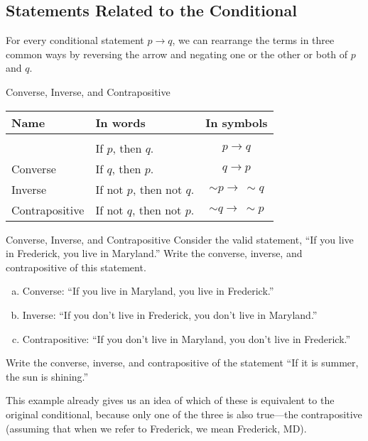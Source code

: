 \subsection{Statements Related to the Conditional}
For every conditional statement $p \to q$, we can rearrange the terms in three common ways by reversing the arrow and negating one or the other or both of $p$ and $q$.

\begin{proc}{Converse, Inverse, and Contrapositive}
\begin{tabular}{l l c}
Name & In words & In symbols\\
\hline
& & \\
 & If $p$, then $q$. & $p \to q$\\
Converse & If $q$, then $p$. & $q \to p$\\
Inverse & If not $p$, then not $q$. & $\sim p \to\ \sim q$\\
Contrapositive & If not $q$, then not $p$. & $\sim q \to\ \sim p$
\end{tabular}
\end{proc}

\begin{example}[https://www.youtube.com/watch?v=GDE6Yg22DUk]{Converse, Inverse, and Contrapositive}
Consider the valid statement, ``If you live in Frederick, you live in Maryland.''  Write the converse, inverse, and contrapositive of this statement.\\

\sol
\begin{enumerate}[(a)]
\item Converse: ``If you live in Maryland, you live in Frederick.''
\item Inverse: ``If you don't live in Frederick, you don't live in Maryland.''
\item Contrapositive: ``If you don't live in Maryland, you don't live in Frederick.''
\end{enumerate}
\end{example}

\begin{try}
Write the converse, inverse, and contrapositive of the statement ``If it is summer, the sun is shining.''
\end{try}

This example already gives us an idea of which of these is equivalent to the original conditional, because only one of the three is also true---the contrapositive (assuming that when we refer to Frederick, we mean Frederick, MD).

